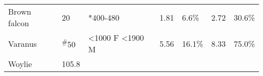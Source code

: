 \documentclass[version=last,
    paper=a4,                               %
    10pt,                                   %
    dvipsnames,
    oneside,                              %
    headings=openany,                       %
    open=any,
    BCOR=7mm,                               %
    DIV=15,     %
]{scrbook}
\begin{document}
\begin{longtable}[c]{@{}lllllll@{}}
\begin{minipage}[t]{0.12\columnwidth}
Brown falcon
\end{minipage} & \begin{minipage}[t]{0.12\columnwidth}\raggedright
20
\end{minipage} & \begin{minipage}[t]{0.12\columnwidth}\raggedright
*400-480
\end{minipage} & \begin{minipage}[t]{0.12\columnwidth}\raggedright
1.81
\end{minipage} & \begin{minipage}[t]{0.12\columnwidth}\raggedright
6.6\%
\end{minipage} & \begin{minipage}[t]{0.12\columnwidth}\raggedright
2.72
\end{minipage} & \begin{minipage}[t]{0.12\columnwidth}\raggedright
30.6\%
\end{minipage}
\\\addlinespace
\begin{minipage}[t]{0.12\columnwidth}\raggedright
Varanus
\end{minipage} & \begin{minipage}[t]{0.12\columnwidth}\raggedright
\textsuperscript{\#}50
\end{minipage} & \begin{minipage}[t]{0.12\columnwidth}\raggedright
\textless{}1000 F \textless{}1900 M
\end{minipage} & \begin{minipage}[t]{0.12\columnwidth}\raggedright
5.56
\end{minipage} & \begin{minipage}[t]{0.12\columnwidth}\raggedright
16.1\%
\end{minipage} & \begin{minipage}[t]{0.12\columnwidth}\raggedright
8.33
\end{minipage} & \begin{minipage}[t]{0.12\columnwidth}\raggedright
75.0\%
\end{minipage}
\\\addlinespace
\begin{minipage}[t]{0.12\columnwidth}\raggedright
Woylie
\end{minipage} & \begin{minipage}[t]{0.12\columnwidth}\raggedright
105.8
\end{minipage} & \begin{minipage}[t]{0.12\columnwidth}\raggedright

\end{minipage}
\end{longtable}
\end{document}
